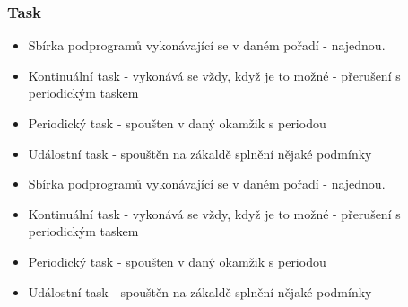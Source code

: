 \subsubsection*{Task}
\begin{itemize}
  \item Sbírka podprogramů vykonávající se v daném pořadí - najednou.
  \item Kontinuální task - vykonává se vždy, když je to možné - přerušení s periodickým taskem
  \item Periodický task - spoušten v daný okamžik s periodou
  \item Událostní task - spouštěn na zákaldě splnění nějaké podmínky
    \item Sbírka podprogramů vykonávající se v daném pořadí - najednou.
    \item Kontinuální task - vykonává se vždy, když je to možné - přerušení s periodickým taskem
    \item Periodický task - spoušten v daný okamžik s periodou
    \item Událostní task - spouštěn na zákaldě splnění nějaké podmínky
\end{itemize}

